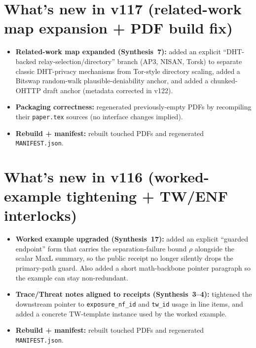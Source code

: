 \documentclass[11pt]{article}
\begin{document}
\section{What's new in v117 (related-work map expansion + PDF build fix)}
\begin{itemize}[leftmargin=*]
\item \textbf{Related-work map expanded (Synthesis~7):} added an explicit ``DHT-backed relay-selection/directory'' branch (AP3, NISAN, Torsk) to separate classic DHT-privacy mechanisms from Tor-style directory scaling, added a Bitswap random-walk plausible-deniability anchor, and added a chunked-OHTTP draft anchor (metadata corrected in v122).
\item \textbf{Packaging correctness:} regenerated previously-empty PDFs by recompiling their \texttt{paper.tex} sources (no interface changes implied).
\item \textbf{Rebuild + manifest:} rebuilt touched PDFs and regenerated \texttt{MANIFEST.json}.
\end{itemize}

\section{What's new in v116 (worked-example tightening + TW/ENF interlocks)}
\begin{itemize}[leftmargin=*]
\item \textbf{Worked example upgraded (Synthesis~17):} added an explicit ``guarded endpoint'' form that carries the separation-failure bound $\rho$ alongside the scalar MaxL summary, so the public receipt no longer silently drops the primary-path guard. Also added a short math-backbone pointer paragraph so the example can stay non-redundant.
\item \textbf{Trace/Threat notes aligned to receipts (Synthesis~3--4):} tightened the downstream pointer to \texttt{exposure\_nf\_id} and \texttt{tw\_id} usage in line items, and added a concrete TW-template instance used by the worked example.
\item \textbf{Rebuild + manifest:} rebuilt touched PDFs and regenerated \texttt{MANIFEST.json}.
\end{itemize}
\end{document}
